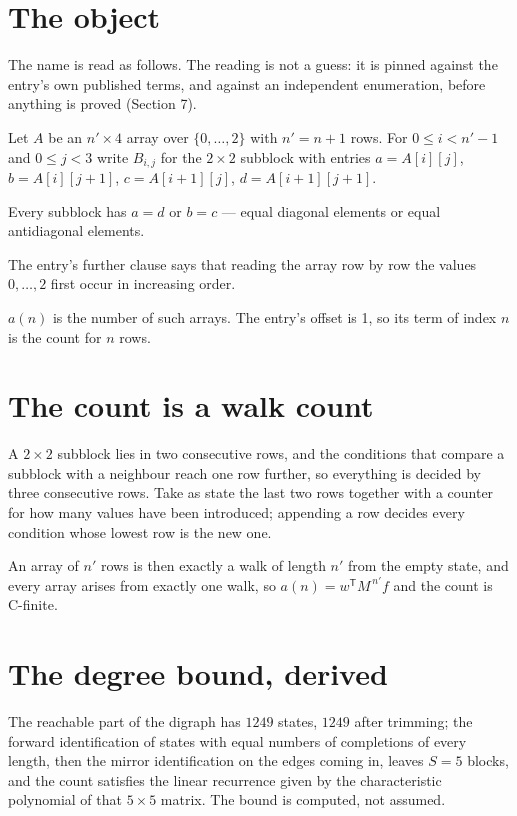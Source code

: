 \documentclass[11pt]{article}
\theoremstyle{definition}
\begin{document}
\section{The object}

The name is read as follows. The reading is not a guess: it is pinned against the entry's own published terms, and against an independent enumeration, before anything is proved (Section 7).

Let $A$ be an $n' \times 4$ array over $\{0,\dots,2\}$ with $n' = n + 1$ rows. For $0 \le i < n'-1$ and $0 \le j < 3$ write $B_{i,j}$ for the $2\times2$ subblock with entries $a = A[i][j]$, $b = A[i][j{+}1]$, $c = A[i{+}1][j]$, $d = A[i{+}1][j{+}1]$.

Every subblock has $a = d$ or $b = c$ --- equal diagonal elements or equal antidiagonal elements.

The entry's further clause says that reading the array row by row the values $0,\dots,2$ first occur in increasing order.

$a(n)$ is the number of such arrays. The entry's offset is 1, so its term of index $n$ is the count for $n$ rows.

\section{The count is a walk count}

A $2\times2$ subblock lies in two consecutive rows, and the conditions that compare a subblock with a neighbour reach one row further, so everything is decided by three consecutive rows. Take as state the last two rows together with a counter for how many values have been introduced; appending a row decides every condition whose lowest row is the new one.

An array of $n'$ rows is then exactly a walk of length $n'$ from the empty state, and every array arises from exactly one walk, so $a(n) = w^{\mathsf T}M^{\,n'}f$ and the count is C-finite.

\section{The degree bound, derived}

The reachable part of the digraph has $1249$ states, $1249$ after trimming; the forward identification of states with equal numbers of completions of every length, then the mirror identification on the edges coming in, leaves $S = 5$ blocks, and the count satisfies the linear recurrence given by the characteristic polynomial of that $5\times5$ matrix. The bound is computed, not assumed.
\end{document}
